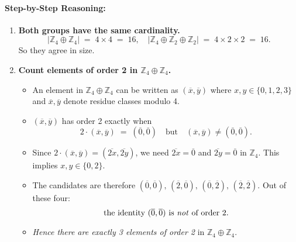 \documentclass[12pt]{article}
\theoremstyle{definition} %
\theoremstyle{plain} %
\begin{document}
\paragraph{Step-by-Step Reasoning:}

\begin{enumerate}
  \item \textbf{Both groups have the same cardinality.}
  \[
    |\mathbb{Z}_4 \oplus \mathbb{Z}_4| \;=\; 4 \times 4 \;=\; 16,
    \quad
    |\mathbb{Z}_4 \oplus \mathbb{Z}_2 \oplus \mathbb{Z}_2| \;=\; 4 \times 2 \times 2 \;=\; 16.
  \]
  So they agree in size.

  \item \textbf{Count elements of order 2 in \(\mathbb{Z}_4 \oplus \mathbb{Z}_4\).}
    \begin{itemize}
      \item An element in $\mathbb{Z}_4 \oplus \mathbb{Z}_4$ can be written as $(\overline{x}, \overline{y})$ where $x,y \in \{0,1,2,3\}$ and $\overline{x}, \overline{y}$ denote residue classes modulo 4.
      \item $(\overline{x},\overline{y})$ has order 2 exactly when 
      \[
        2\cdot(\overline{x}, \overline{y}) \;=\; (\overline{0}, \overline{0})
        \quad \text{but} \quad (\overline{x}, \overline{y}) \neq (\overline{0}, \overline{0}).
      \]
      \item Since $2\cdot(\overline{x}, \overline{y}) = (\overline{2x}, \overline{2y})$, we need $\overline{2x} = \overline{0}$ and $\overline{2y} = \overline{0}$ in $\mathbb{Z}_4$. This implies $x,y \in \{0,2\}$. 
      \item The candidates are therefore $(\overline{0},\overline{0}),\,(\overline{2},\overline{0}),\,(\overline{0},\overline{2}),\,(\overline{2},\overline{2})$. Out of these four:
        \[
          \text{the identity }(\overline{0},\overline{0})\text{ is \emph{not} of order 2.}
        \]
      \item \emph{Hence there are exactly 3 elements of order 2} in $\mathbb{Z}_4 \oplus \mathbb{Z}_4$.
    \end{itemize}


\end{enumerate}
\end{document}
